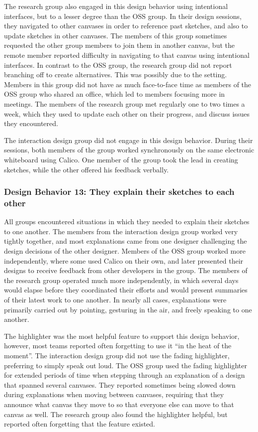 The research group also engaged in this design behavior using intentional interfaces, but to a lesser degree than the OSS group. In their design sessions, they navigated to other canvases in order to reference past sketches, and also to update sketches in other canvases. The members of this group sometimes requested the other group members to join them in another canvas, but the remote member reported difficulty in navigating to that canvas using intentional interfaces. In contrast to the OSS group, the research group did not report branching off to create alternatives. This was possibly due to the setting. Members in this group did not have as much face-to-face time as members of the OSS group who shared an office, which led to members focusing more in meetings. The members of the research group met regularly one to two times a week, which they used to update each other on their progress, and discuss issues they encountered. 

The interaction design group did not engage in this design behavior. During their sessions, both members of the group worked synchronously on the same electronic whiteboard using Calico. One member of the group took the lead in creating sketches, while the other offered his feedback verbally.

%

\subsubsection{Design Behavior 13: They explain their sketches to each other}

All groups encountered situations in which they needed to explain their sketches to one another. The members from the interaction design group worked very tightly together, and most explanations came from one designer challenging the design decisions of the other designer. Members of the OSS group worked more independently, where some used Calico on their own, and later presented their designs to receive feedback from other developers in the group. The members of the research group operated much more independently, in which several days would elapse before they coordinated their efforts and would present summaries of their latest work to one another. In nearly all cases, explanations were primarily carried out by pointing, gesturing in the air, and freely speaking to one another.

The highlighter was the most helpful feature to support this design behavior, however, most teams reported often forgetting to use it ``in the heat of the moment''. The interaction design group did not use the fading highlighter, preferring to simply speak out loud. The OSS group used the fading highlighter for extended periods of time when stepping through an explanation of a design that spanned several canvases. They reported sometimes being slowed down during explanations when moving between canvases, requiring that they announce what canvas they move to so that everyone else can move to that canvas as well. The research group also found the highlighter helpful, but reported often forgetting that the feature existed.

